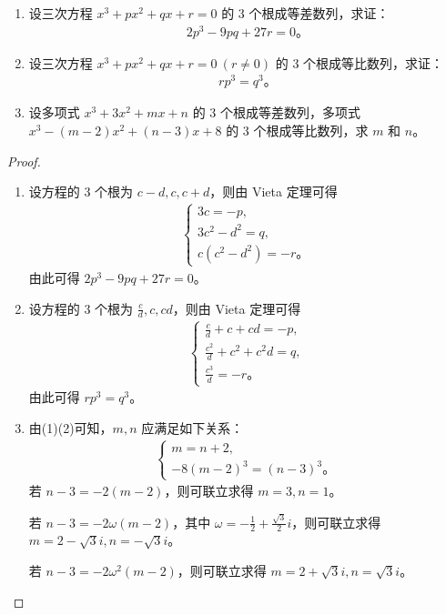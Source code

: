 \documentclass[../../main.tex]{subfiles}%
\begin{document}
\begin{example}
\begin{enumerate}[(1)]
\item 设三次方程 $x^3 + px^2 + qx + r = 0$ 的 3 个根成等差数列，求证：
\begin{align*}
2p^3 - 9pq + 27r = 0。
\end{align*}

\item 设三次方程 $x^3 + px^2 + qx + r = 0 \ (r \neq 0)$ 的 3 个根成等比数列，求证：
\begin{align*}
rp^3 = q^3。
\end{align*}

\item 设多项式 $x^3 + 3x^2 + mx + n$ 的 3 个根成等差数列，多项式 $x^3 - (m - 2)x^2 + (n - 3)x + 8$ 的 3 个根成等比数列，求 $m$ 和 $n$。
\end{enumerate}
\end{example}
\begin{proof}
\begin{enumerate}[(1)]
\item 设方程的 3 个根为 $c - d, c, c + d$，则由 Vieta 定理可得
\begin{align*}
\begin{cases}
3c = -p, \\
3c^2 - d^2 = q, \\
c(c^2 - d^2) = -r。
\end{cases}
\end{align*}
由此可得 $2p^3 - 9pq + 27r = 0。$

\item 设方程的 3 个根为 $\frac{c}{d}, c, cd$，则由 Vieta 定理可得
\begin{align*}
\begin{cases}
\frac{c}{d} + c + cd = -p, \\
\frac{c^2}{d} + c^2 + c^2 d = q, \\
\frac{c^3}{d} = -r。
\end{cases}
\end{align*}
由此可得 $rp^3 = q^3。$

\item 由(1)(2)可知，$m, n$ 应满足如下关系：
\begin{align*}
\begin{cases}
m = n + 2, \\
-8(m - 2)^3 = (n - 3)^3。
\end{cases}
\end{align*}
若 $n - 3 = -2(m - 2)$，则可联立求得 $m = 3, n = 1$。

若 $n - 3 = -2\omega(m - 2)$，其中 $\omega = -\frac{1}{2} + \frac{\sqrt{3}}{2}i$，则可联立求得 $m = 2 - \sqrt{3}i, n = -\sqrt{3}i$。

若 $n - 3 = -2\omega^2(m - 2)$，则可联立求得 $m = 2 + \sqrt{3}i, n = \sqrt{3}i。$
\end{enumerate}
\end{proof}
\end{document}
